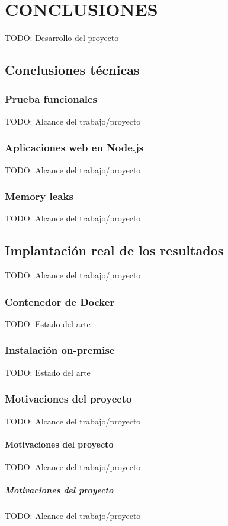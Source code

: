 \chapter{CONCLUSIONES\label{sec:conclusiones}}

TODO: Desarrollo del proyecto

\section{Conclusiones técnicas}

\subsection{Prueba funcionales}

TODO: Alcance del trabajo/proyecto

\subsection{Aplicaciones web en Node.js}

TODO: Alcance del trabajo/proyecto

\subsection{Memory leaks}

TODO: Alcance del trabajo/proyecto

\section{Implantación real de los resultados}

TODO: Alcance del trabajo/proyecto

\subsection{Contenedor de Docker}

TODO: Estado del arte

\subsection{Instalación on-premise}

TODO: Estado del arte

\subsection{Motivaciones del proyecto}

TODO: Alcance del trabajo/proyecto

\subsubsection{Motivaciones del proyecto}

TODO: Alcance del trabajo/proyecto

\paragraph{Motivaciones del proyecto}

TODO: Alcance del trabajo/proyecto
